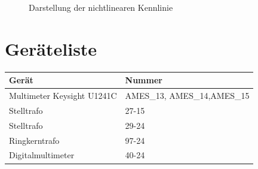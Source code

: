 \documentclass[
12pt,
a4paper,
headings=small,                    %
bibliography=totoc,                %
listof=totoc,                      %
parskip=half*,                     %
]{scrartcl}                        %
\begin{document}
\begin{figure}[H]
    \centering
    \caption{Darstellung der nichtlinearen Kennlinie}
    \label{fig:kennlinie}
\end{figure}


\printbibliography


\section*{Geräteliste}
\begin{table} [H]
    \begin{tabular}{|l|l|}
        \hline
        \textbf{Gerät }            & \textbf{Nummer }            \\ \hline
        Multimeter Keysight U1241C & AMES\_13, AMES\_14,AMES\_15 \\ \hline
        Stelltrafo                 & 27-15                       \\ \hline
        Stelltrafo                 & 29-24                       \\ \hline
        Ringkerntrafo              & 97-24                       \\ \hline
        Digitalmultimeter          & 40-24                       \\ \hline
    \end{tabular}
\end{table}
\end{document}
